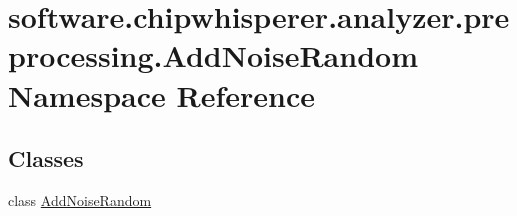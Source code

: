 \hypertarget{namespacesoftware_1_1chipwhisperer_1_1analyzer_1_1preprocessing_1_1AddNoiseRandom}{}\section{software.\+chipwhisperer.\+analyzer.\+preprocessing.\+Add\+Noise\+Random Namespace Reference}
\label{namespacesoftware_1_1chipwhisperer_1_1analyzer_1_1preprocessing_1_1AddNoiseRandom}
\subsection*{Classes}
\begin{DoxyCompactItemize}
\item 
class \hyperlink{classsoftware_1_1chipwhisperer_1_1analyzer_1_1preprocessing_1_1AddNoiseRandom_1_1AddNoiseRandom}{Add\+Noise\+Random}
\end{DoxyCompactItemize}
